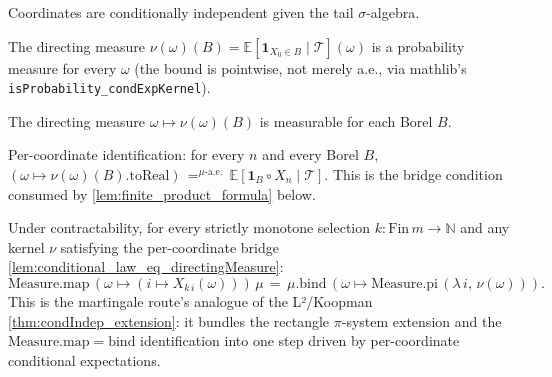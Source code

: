 \begin{lemma}
  \label{lem:block_coord_condIndep}
  \leanok
  Coordinates are conditionally independent given the tail $\sigma$-algebra.
\end{lemma}

\begin{lemma}
  \label{lem:directingMeasure_isProb}
  \leanok
  The directing measure $\nu(\omega)(B) = \mathbb{E}[\mathbf{1}_{X_0 \in B} \mid \mathcal{T}](\omega)$
  is a probability measure for every $\omega$ (the bound is pointwise, not merely a.e., via
  mathlib's \texttt{isProbability\_condExpKernel}).
\end{lemma}

\begin{lemma}
  \label{lem:directingMeasure_measurable}
  \leanok
  The directing measure $\omega \mapsto \nu(\omega)(B)$ is measurable for each Borel $B$.
\end{lemma}

\begin{lemma}
  \label{lem:conditional_law_eq_directingMeasure}
  \leanok
  Per-coordinate identification: for every $n$ and every Borel $B$,
  $(\omega \mapsto \nu(\omega)(B).\mathrm{toReal})
    \, =^{\mu\text{-a.e.}} \, \mathbb{E}[\mathbf{1}_B \circ X_n \mid \mathcal{T}]$.
  This is the bridge condition consumed by \ref{lem:finite_product_formula} below.
\end{lemma}

\begin{lemma}
  \label{lem:finite_product_formula}
  \leanok
  Under contractability, for every strictly monotone selection
  $k : \mathrm{Fin}\,m \to \mathbb{N}$ and any kernel $\nu$ satisfying the per-coordinate
  bridge \ref{lem:conditional_law_eq_directingMeasure}:
  \[
    \mathrm{Measure.map}\,(\omega \mapsto (i \mapsto X_{k\,i}(\omega)))\,\mu
      \,=\, \mu.\mathrm{bind}\,(\omega \mapsto \mathrm{Measure.pi}\,(\lambda\, i,\, \nu(\omega))).
  \]
  This is the martingale route's analogue of the L²/Koopman \ref{thm:condIndep_extension}:
  it bundles the rectangle $\pi$-system extension and the
  $\mathrm{Measure.map} = \mathrm{bind}$ identification into one step driven by
  per-coordinate conditional expectations.
\end{lemma}

